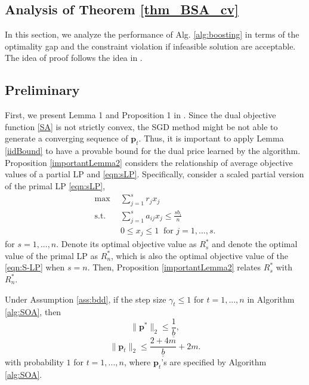 \documentclass{article} %
\newcommand{\p}{\bm{p}}
\begin{document}
\begin{APPENDICES}

    \section{Analysis of Theorem \ref{thm_BSA_cv}}
        In this section, we analyze the performance of Alg. \ref{alg:boosting} in terms of the optimality gap and the constraint violation if infeasible solution are acceptable. The idea of proof follows the idea in \cite{li2020simple}. 
        
        \subsection{Preliminary}
        
        First, we present Lemma 1 and Proposition 1 in \cite{li2020simple}. Since the dual objective function \eqref{SA} is not strictly convex, the SGD method might be not able to generate a converging sequence of $\bm{p}_t$. Thus, it is important to apply Lemma \ref{iidBound} to have a provable bound for the dual price learned by the algorithm. Proposition \ref{importantLemma2} considers the relationship of average objective values of a partial LP and \eqref{eqn:sLP}. Specifically, consider a scaled partial version of the primal LP \eqref{eqn:sLP},
        \begin{align} \label{eqn:S-LP}
              \tag{pLP}  \max \ \ & \sum_{j=1}^s r_jx_j   \\
                \text{s.t. }\ & \sum_{j=1}^s a_{ij}x_j \le \frac{sb_i}{n}  \nonumber \\
                & 0 \le x_j \le 1\ \text{ for } j=1,...,s.\nonumber
        \end{align}
        for $s=1,...,n$. Denote its optimal objective value as $R_s^*$ and denote the optimal value of the primal LP as $R_n^*$, which is also the optimal objective value of the \eqref{eqn:S-LP} when $s=n$. Then, Proposition \ref{importantLemma2} relates $R_s^*$ with $R_n^*.$
        
        \begin{lemma}
        \label{iidBound} Under Assumption \ref{ass:bdd}, if the step size $\gamma_t \le 1$ for $t=1,...,n$ in Algorithm \ref{alg:SOA}, then
        $$\|\bm{p}^*\|_2\leq\frac{1}{\underline{b}},$$  
        $$\|\bm{p}_t\|_2 \leq{\frac{2+4m}{\underline{b}}} + 2m.$$ with probability $1$ for $t=1,...,n$, where $\p_t$'s are specified by Algorithm \ref{alg:SOA}.
        \end{lemma}
        

\end{APPENDICES}
\end{document}
